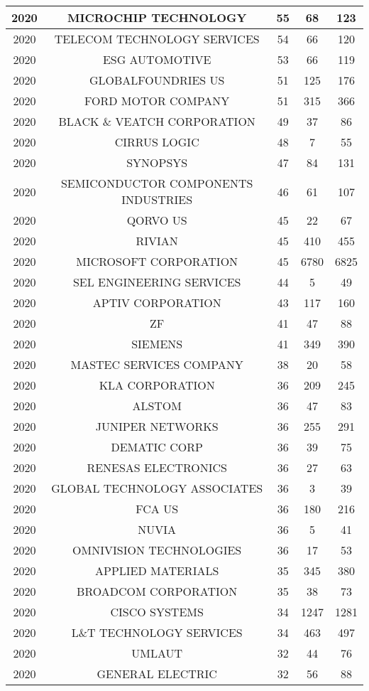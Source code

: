 \documentclass{article}%
\begin{document}
\begin{longtable}{c|c|c|c|c}
2020&MICROCHIP TECHNOLOGY&55&68&123\\%
\hline%
2020&TELECOM TECHNOLOGY SERVICES&54&66&120\\%
\hline%
2020&ESG AUTOMOTIVE&53&66&119\\%
\hline%
2020&GLOBALFOUNDRIES US&51&125&176\\%
\hline%
2020&FORD MOTOR COMPANY&51&315&366\\%
\hline%
2020&BLACK \& VEATCH CORPORATION&49&37&86\\%
\hline%
2020&CIRRUS LOGIC&48&7&55\\%
\hline%
2020&SYNOPSYS&47&84&131\\%
\hline%
2020&SEMICONDUCTOR COMPONENTS INDUSTRIES&46&61&107\\%
\hline%
2020&QORVO US&45&22&67\\%
\hline%
2020&RIVIAN&45&410&455\\%
\hline%
2020&MICROSOFT CORPORATION&45&6780&6825\\%
\hline%
2020&SEL ENGINEERING SERVICES&44&5&49\\%
\hline%
2020&APTIV CORPORATION&43&117&160\\%
\hline%
2020&ZF&41&47&88\\%
\hline%
2020&SIEMENS&41&349&390\\%
\hline%
2020&MASTEC SERVICES COMPANY&38&20&58\\%
\hline%
2020&KLA CORPORATION&36&209&245\\%
\hline%
2020&ALSTOM&36&47&83\\%
\hline%
2020&JUNIPER NETWORKS&36&255&291\\%
\hline%
2020&DEMATIC CORP&36&39&75\\%
\hline%
2020&RENESAS ELECTRONICS&36&27&63\\%
\hline%
2020&GLOBAL TECHNOLOGY ASSOCIATES&36&3&39\\%
\hline%
2020&FCA US&36&180&216\\%
\hline%
2020&NUVIA&36&5&41\\%
\hline%
2020&OMNIVISION TECHNOLOGIES&36&17&53\\%
\hline%
2020&APPLIED MATERIALS&35&345&380\\%
\hline%
2020&BROADCOM CORPORATION&35&38&73\\%
\hline%
2020&CISCO SYSTEMS&34&1247&1281\\%
\hline%
2020&L\&T TECHNOLOGY SERVICES&34&463&497\\%
\hline%
2020&UMLAUT&32&44&76\\%
\hline%
2020&GENERAL ELECTRIC&32&56&88\\%

\end{longtable}
\end{document}
